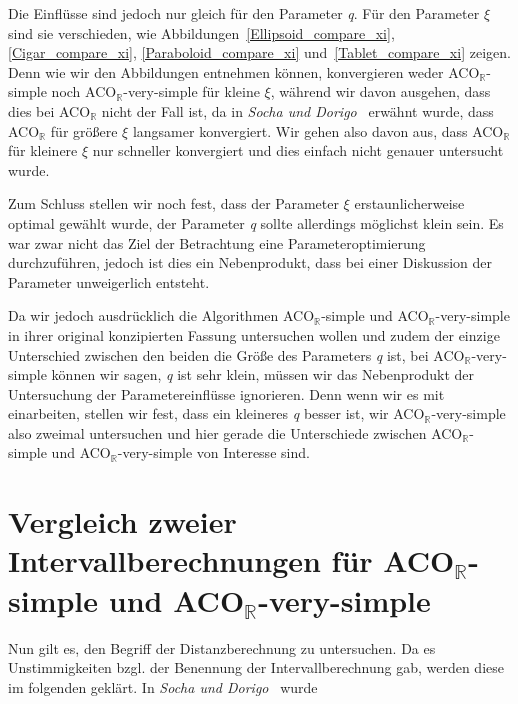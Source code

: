 \documentclass[fontsize=12, a4aper]{scrartcl}
\begin{document}
	Die Einflüsse sind jedoch nur gleich für den Parameter \textit{q}. Für den Parameter \(\xi\) sind sie verschieden, wie Abbildungen~\ref{Ellipsoid_compare_xi}, \ref{Cigar_compare_xi}, \ref{Paraboloid_compare_xi} und~\ref{Tablet_compare_xi} zeigen. Denn wie wir den Abbildungen entnehmen können, konvergieren weder ACO\(_{\mathbb{R}}\)-simple noch ACO\(_{\mathbb{R}}\)-very-simple für kleine \(\xi\), während wir davon ausgehen, dass dies bei ACO\(_{\mathbb{R}}\) nicht der Fall ist, da in \textit{Socha und Dorigo}~\cite{socha2008ant} erwähnt wurde, dass ACO\(_{\mathbb{R}}\) für größere \(\xi\) langsamer konvergiert. Wir gehen also davon aus, dass ACO\(_{\mathbb{R}}\) für kleinere \(\xi\) nur schneller konvergiert und dies einfach nicht genauer untersucht wurde.\hfill\newline
	
	Zum Schluss stellen wir noch fest, dass der Parameter \(\xi\) erstaunlicherweise optimal gewählt wurde, der Parameter \textit{q} sollte allerdings möglichst klein sein. Es war zwar nicht das Ziel der Betrachtung eine Parameteroptimierung durchzuführen, jedoch ist dies ein Nebenprodukt, dass bei einer Diskussion der Parameter unweigerlich entsteht.\hfill\newline
	
	Da wir jedoch ausdrücklich die Algorithmen ACO\(_{\mathbb{R}}\)-simple und ACO\(_{\mathbb{R}}\)-very-simple in ihrer original konzipierten Fassung untersuchen wollen und zudem der einzige Unterschied zwischen den beiden die Größe des Parameters \textit{q} ist, bei ACO\(_{\mathbb{R}}\)-very-simple können wir sagen, \textit{q} ist sehr klein, müssen wir das Nebenprodukt der Untersuchung der Parametereinflüsse ignorieren. Denn wenn wir es mit einarbeiten, stellen wir fest, dass ein kleineres \textit{q} besser ist, wir ACO\(_{\mathbb{R}}\)-very-simple also zweimal untersuchen und hier gerade die Unterschiede zwischen ACO\(_{\mathbb{R}}\)-simple und ACO\(_{\mathbb{R}}\)-very-simple von Interesse sind.
	
	\section{Vergleich zweier Intervallberechnungen für ACO\(_{\mathbb{R}}\)-simple und ACO\(_{\mathbb{R}}\)-very-simple}
	
	Nun gilt es, den Begriff der Distanzberechnung zu untersuchen. Da es Unstimmigkeiten bzgl. der Benennung der Intervallberechnung gab, werden diese im folgenden geklärt. In \textit{Socha und Dorigo}~\cite{socha2008ant} wurde
	
\end{document}
